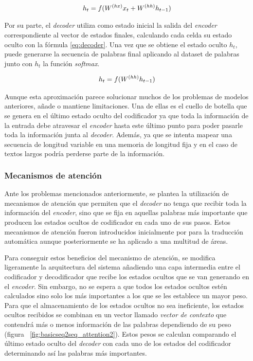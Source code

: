 \begin{equation}
	\label{eq:encoder}
	\Large
	h_t = f(W^{(hx)}x_t+W^{(hh)}h_{t-1})
\end{equation}


Por su parte, el \textit{decoder} utiliza como estado inicial la salida del \textit{encoder} correspondiente al vector de estados finales, calculando cada celda su estado oculto con la fórmula \ref{eq:decoder}. Una vez que se obtiene el estado oculto $h_{t}$, puede generarse la secuencia de palabras final aplicando al dataset de palabras junto con $h_{t}$ la función \textit{softmax}.

\begin{equation}
	\label{eq:decoder}
	\Large
	h_t = f(W^{(hh)}h_{t-1})
\end{equation}

Aunque esta aproximación parece solucionar muchos de los problemas de modelos anteriores, añade o mantiene limitaciones. Una de ellas es el cuello de botella que se genera en el último estado oculto del codificador ya que toda la información de la entrada debe atravesar el \textit{encoder} hasta este último punto para poder pasarle toda la información junta al \textit{decoder}. Además, ya que se intenta mapear una secuencia de longitud variable en una memoria de longitud fija y en el caso de textos largos podría perderse parte de la información. 


\subsubsection{Mecanismos de atención}

Ante los problemas mencionados anteriormente, se plantea la utilización de mecanismos de atención que permiten que el \textit{decoder} no tenga que recibir toda la información del \textit{encoder}, sino que se fija en aquellas palabras más importante que producen los estados ocultos de codificador en cada uno de sus pasos. Estos mecanismos de atención fueron introducidos inicialmente por \cite{Bahdanau} para la traducción automática aunque posteriormente se ha aplicado a una multitud de áreas. 


Para conseguir estos beneficios del mecanismo de atención, se modifica ligeramente la arquitectura del sistema añadiendo una capa intermedia entre el codificador y decodificador que recibe los estados ocultos que se van generando en el \textit{encoder}. Sin embargo, no se espera a que todos los estados ocultos estén calculados sino solo los más importantes a los que se les establece un mayor peso. Para que el almacenamiento de los estados ocultos no sea ineficiente, los estados ocultos recibidos se combinan en un vector llamado \textit{vector de contexto} que contendrá más o menos información de las palabras dependiendo de su peso (figura ~\ref{fig:basicseq2seq_attention2}). Estos pesos se calculan comparando el último estado oculto del \textit{decoder} con cada uno de los estados del codificador determinando así las palabras más importantes.



